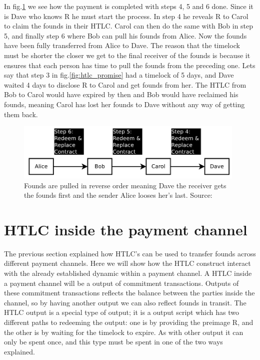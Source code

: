 In fig.\ref{fig:htlc_settle} we see how the payment is completed with steps 4, 5 and 6 done. Since it is Dave who knows R he must start the process. In step 4 he reveals R to Carol to claim the founds in their HTLC. Carol can then do the same with Bob in step 5, and finally step 6 where Bob can pull his founds from Alice.
Now the founds have been fully transferred from Alice to Dave.
The reason that the timelock must be shorter the closer we get to the final receiver of the founds is because it ensures that each person has time to pull the founds from the preceding one. Lets say that step 3 in fig.\ref{fig:htlc_promise} had a timelock of 5 days, and Dave waited 4 days to disclose R to Carol and get founds from her. The HTLC from Bob to Carol would have expired by then and Bob would have reclaimed his founds, meaning Carol has lost her founds to Dave without any way of getting them back.

\begin{figure}[h]
    \centering
    \includegraphics[width=11cm]{figures/htlc_settle.png}
    \caption{ Founds are pulled in reverse order meaning Dave the receiver gets the founds first and the sender Alice looses her's last. Source: \cite{poon2015bitcoin}}
    \label{fig:htlc_settle}
\end{figure}


\section{HTLC inside the payment channel}
The previous section explained how HTLC's can be used to transfer founds across different payment channels.
Here we will show how the HTLC construct interact with the already established dynamic within a payment channel.
A HTLC inside a payment channel will be a output of commitment transactions. Outputs of these commitment transactions reflects the balance between the parties inside the channel, so by having another output we can also reflect founds in transit. The HTLC output is a special type of output; it is a output script which has two different paths to redeeming the output: one is by providing the preimage R, and the other is by waiting for the timelock to expire. As with other output it can only be spent once, and this type must be spent in one of the two ways explained.

